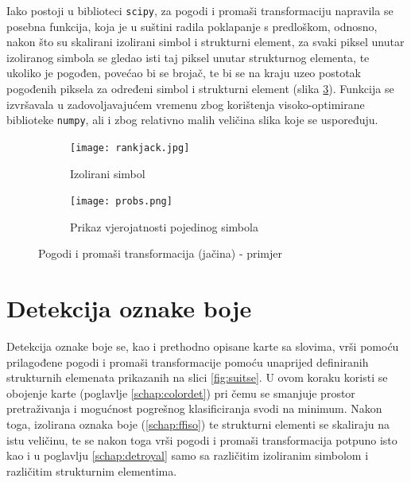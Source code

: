 \documentclass[times, zavrsni, numeric, utf8]{fer}
\newcommand{\code}[1]{\texttt{#1}}
\begin{document}
Iako postoji u biblioteci \code{scipy}, za pogodi i promaši transformaciju napravila se posebna funkcija, koja je u suštini radila poklapanje s predloškom, odnosno, nakon što su skalirani izolirani simbol i strukturni element, za svaki piksel unutar izoliranog simbola se gledao isti taj piksel unutar strukturnog elementa, te ukoliko je pogođen, povećao bi se brojač, te bi se na kraju uzeo postotak pogođenih piksela za određeni simbol i strukturni element (slika \ref{fig:homprobs}). Funkcija se izvršavala u zadovoljavajućem vremenu zbog korištenja visoko-optimirane biblioteke \code{numpy}, ali i zbog relativno malih veličina slika koje se uspoređuju. 
\begin{figure}[H]
\begin{subfigure}{.5\textwidth}
  \centering
  \texttt{[image: rankjack.jpg]}
  \caption{Izolirani simbol}
  \label{fig:rjack}
\end{subfigure}%
\begin{subfigure}{.5\textwidth}
  \centering
  \texttt{[image: probs.png]}
  \caption{Prikaz vjerojatnosti pojedinog simbola}
  \label{fig:termout}
\end{subfigure}
\caption{Pogodi i promaši transformacija (jačina) - primjer}
\label{fig:homprobs}
\end{figure}
\section{Detekcija oznake boje}
\label{schap:suitdet}
\hspace*{0.5cm}Detekcija oznake boje se, kao i prethodno opisane karte sa slovima, vrši pomoću prilagođene pogodi i promaši transformacije pomoću unaprijed definiranih strukturnih elemenata prikazanih na slici \ref{fig:suitse}. U ovom koraku koristi se obojenje karte (poglavlje \ref{schap:colordet}) pri čemu se smanjuje prostor pretraživanja i mogućnost pogrešnog klasificiranja svodi na minimum. Nakon toga, izolirana oznaka boje (\ref{schap:ffiso}) te strukturni elementi se skaliraju na istu veličinu, te se nakon toga vrši pogodi i promaši transformacija potpuno isto kao i u poglavlju \ref{schap:detroyal} samo sa različitim izoliranim simbolom i različitim strukturnim elementima.
\end{document}
